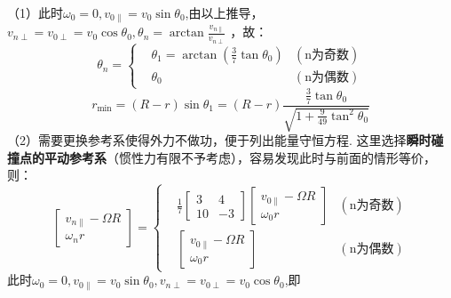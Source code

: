 \documentclass{ctexart}
\begin{document}
\noindent     （1）此时$\omega_0=0,v_{0\parallel}=v_0\sin\theta_0$,由以上推导，$v_{n\perp}=v_{0\perp}=v_0\cos\theta_0,\theta_n=\arctan\frac{v_{n\parallel}}{v_{n\perp}}$
    ，故：
    \begin{equation}
        \theta_n=
        \left\{
            \begin{aligned}
                &\theta_1=\arctan(\frac{3}{7}\tan\theta_0)&(\text{n为奇数}) \\
                &\theta_0&(\text{n为偶数})
            \end{aligned}
        \right.\tag{5.4}
    \end{equation}
    \begin{equation}
        r_{\min}=(R-r)\sin\theta_1=(R-r)\frac{\frac{3}{7}\tan\theta_0}{\sqrt{1+\frac{9}{49}\tan^2\theta_0}} \tag{5.5}
    \end{equation}
    \noindent     （2）需要更换参考系使得外力不做功，便于列出能量守恒方程. 这里选择\textbf{瞬时碰撞点的平动参考系}（惯性力有限不予考虑），容易发现此时与前面的情形等价，则：
    \begin{equation}
        \begin{bmatrix}
            v_{n\parallel}-\varOmega R \\
            \omega_nr
        \end{bmatrix}
        =
        \left\{
            \begin{aligned}
                &\frac{1}{7}
                \begin{bmatrix}
                    3 & 4 \\
                    10 & -3 
                \end{bmatrix}
                \begin{bmatrix}
                    v_{0\parallel}-\varOmega R \\
                    \omega_0r
                \end{bmatrix}&(\text{n为奇数}) \\
                &\begin{bmatrix}
                    v_{0\parallel}-\varOmega R \\
                    \omega_0r
                \end{bmatrix}&(\text{n为偶数})
            \end{aligned}
        \right. \tag{5.6}
    \end{equation}
    此时$\omega_0=0,v_{0\parallel}=v_0\sin\theta_0,v_{n\perp}=v_{0\perp}=v_0\cos\theta_0$,即
\end{document}
